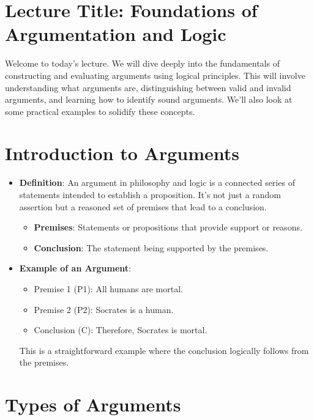 \documentclass{article}
\begin{document}
\tableofcontents
\newpage

\section{Lecture Title: Foundations of Argumentation and Logic}

Welcome to today's lecture. We will dive deeply into the fundamentals of constructing and evaluating arguments using logical principles. This will involve understanding what arguments are, distinguishing between valid and invalid arguments, and learning how to identify sound arguments. We'll also look at some practical examples to solidify these concepts.

\section{Introduction to Arguments}

\begin{itemize}
    \item \textbf{Definition}: An argument in philosophy and logic is a connected series of statements intended to establish a proposition. It's not just a random assertion but a reasoned set of premises that lead to a conclusion.
          \begin{itemize}
              \item \textbf{Premises}: Statements or propositions that provide support or reasons.
              \item \textbf{Conclusion}: The statement being supported by the premises.
          \end{itemize}
    \item \textbf{Example of an Argument}:
          \begin{itemize}
              \item Premise 1 (P1): All humans are mortal.
              \item Premise 2 (P2): Socrates is a human.
              \item Conclusion (C): Therefore, Socrates is mortal.
          \end{itemize}
          This is a straightforward example where the conclusion logically follows from the premises.
\end{itemize}

\section{Types of Arguments}
\end{document}
